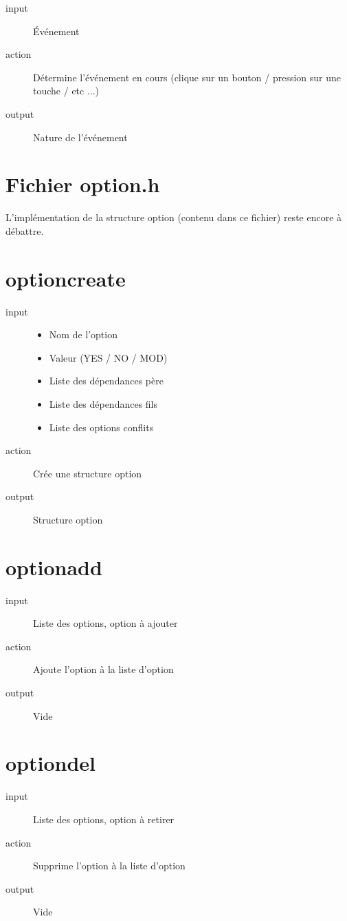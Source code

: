 \documentclass[16pts]{report}
\begin{document}
\begin{description}
    \item[input] Événement
    \item[action] Détermine l'événement en cours (clique sur un bouton / pression
        sur une touche / etc ...)
    \item[output] Nature de l'événement
\end{description}

\section{Fichier option.h}
\label{sec:Fichier option.h}
L'implémentation de la structure option (contenu dans ce fichier) reste encore
à débattre.

\section{option\textunderscore create}
\label{sec:option create}
\begin{description}
    \item[input]
        \begin{itemize}
            \item Nom de l'option
            \item Valeur (YES / NO / MOD)
            \item Liste des dépendances père
            \item Liste des dépendances fils
            \item Liste des options conflits
        \end{itemize}
    \item[action] Crée une structure option
    \item[output] Structure option
\end{description}

\section{option\textunderscore add}
\label{sec:option add}
\begin{description}
    \item[input] Liste des options, option à ajouter
    \item[action] Ajoute l'option à la liste d'option
    \item[output] Vide
\end{description}

\section{option\textunderscore del}
\label{sec:option del}
\begin{description}
    \item[input] Liste des options, option à retirer
    \item[action] Supprime l'option à la liste d'option
    \item[output] Vide
\end{description}
\end{document}
